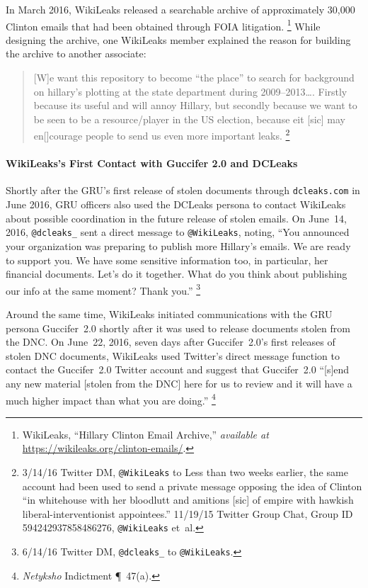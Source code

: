 In March 2016, WikiLeaks released a searchable archive of approximately 30,000 Clinton emails that had been obtained through FOIA litigation.%
\footnote{WikiLeaks, ``Hillary Clinton Email Archive,'' \textit{available at} \url{https://wikileaks.org/clinton-emails/}.}
While designing the archive, one WikiLeaks member explained the reason for building the archive to another associate:

\begin{quote}
[W]e want this repository to become ``the place'' to search for background on hillary's plotting at the state department during 2009--2013\dots.
Firstly because its useful and will annoy Hillary, but secondly because we want to be seen to be a resource/player in the US election, because eit [sic] may en[]courage people to send us even more important leaks.%
\footnote{3/14/16 Twitter DM, \verb+@WikiLeaks+ to 
Less than two weeks earlier, the same account had been used to send a private message opposing the idea of Clinton ``in whitehouse with her bloodlutt and amitions [sic] of empire with hawkish liberal-interventionist appointees.'' 11/19/15 Twitter Group Chat, Group ID 594242937858486276, \verb+@WikiLeaks+ et~al.}
\end{quote}

\paragraph{WikiLeaks's First Contact with Guccifer 2.0 and DCLeaks}

Shortly after the GRU's first release of stolen documents through \verb+dcleaks.com+ in June 2016, GRU officers also used the DCLeaks persona to contact WikiLeaks about possible coordination in the future release of stolen emails.
On June~14, 2016, \verb+@dcleaks_+ sent a direct message to \verb+@WikiLeaks+, noting, ``You announced your organization was preparing to publish more Hillary's emails.
We are ready to support you.
We have some sensitive information too, in particular, her financial documents.
Let's do it together.
What do you think about publishing our info at the same moment?
Thank you.''%
\footnote{6/14/16 Twitter DM, \verb+@dcleaks_+ to \verb+@WikiLeaks+.}

Around the same time, WikiLeaks initiated communications with the GRU persona Guccifer~2.0 shortly after it was used to release documents stolen from the DNC\null.
On June~22, 2016, seven days after Guccifer~2.0's first releases of stolen DNC documents, WikiLeaks used Twitter's direct message function to contact the Guccifer~2.0 Twitter account and suggest that Guccifer~2.0 ``[s]end any new material [stolen from the DNC] here for us to review and it will have a much higher impact than what you are doing.''%
\footnote{\textit{Netyksho} Indictment \P~47(a).}


